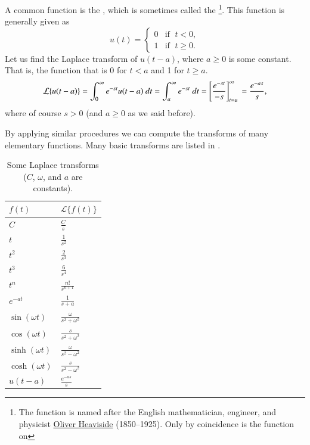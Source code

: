 \documentclass[12pt]{book}
\begin{document}
\begin{example}
A common function is the \emph{}, which is
sometimes called the \emph{}%
\footnote{The function is named after the English mathematician, engineer, and
physicist
\href{http://en.wikipedia.org/wiki/Heaviside}{Oliver Heaviside}
(1850--1925).  Only
by coincidence is the function  on }.
This function is generally given as
\begin{equation*}
u(t) = 
\begin{cases}
0 & \text{if } \; t < 0 , \\
1 & \text{if } \; t \geq 0 .
\end{cases}
\end{equation*}
Let us find the Laplace transform of $u(t-a)$, where $a \geq 0$
is some constant.
That is, the function that is 0 for $t < a$ and 1 for $t \geq a$.
\begin{equation*}
\mathcal{L} \{ u(t-a) \}
=
\int_0^{\infty} e^{-st} u(t-a) ~ dt
=
\int_a^{\infty} e^{-st} ~ dt
=
\left[ \frac{e^{-st}}{-s} \right]_{t=a}^\infty \\
=
\frac{e^{-as}}{s} ,
\end{equation*}
where of course $s > 0$ (and $a \geq 0$ as we said before).
\end{example}

By applying similar procedures we can compute the transforms of many
elementary functions.  Many basic transforms are listed in
.

\begin{table}[h!t]
\capstart
\begin{center}
\begin{tabular}{@{}ll@{}}
\toprule
$f(t)$ & $\mathcal{L} \{ f(t) \}$ \\
\midrule
$C$ & $\frac{C}{s}$ \\[3pt]
$t$ & $\frac{1}{s^2}$ \\[3pt]
$t^2$ & $\frac{2}{s^3}$ \\[3pt]
$t^3$ & $\frac{6}{s^4}$ \\[3pt]
$t^n$ & $\frac{n!}{s^{n+1}}$ \\[3pt]
$e^{-at}$ & $\frac{1}{s+a}$ \\[3pt]
$\sin (\omega t)$ & $\frac{\omega}{s^2+\omega^2}$ \\[3pt]
$\cos (\omega t)$ & $\frac{s}{s^2+\omega^2}$ \\[3pt]
$\sinh (\omega t)$ & $\frac{\omega}{s^2-\omega^2}$ \\[3pt]
$\cosh (\omega t)$ & $\frac{s}{s^2-\omega^2}$ \\[3pt]
$u(t-a)$ & $\frac{e^{-as}}{s}$ \\
\bottomrule
\end{tabular}
\end{center}
\caption{Some Laplace transforms ($C$, $\omega$, and $a$ are
constants).\label{lt:table}}
\end{table}
\end{document}
